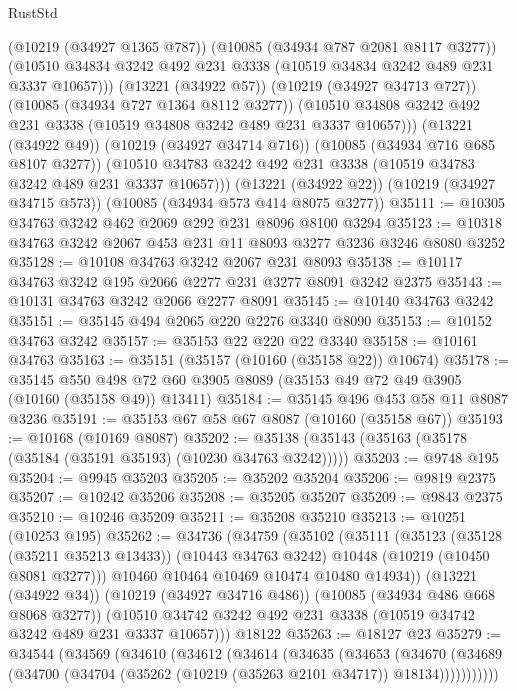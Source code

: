 \begin{lexlean}{RustStd}
\begin{coremodule}
          (@10219 (@34927 @1365 @787))
          (@10085 (@34934 @787 @2081 @8117 @3277))
          (@10510 @34834 @3242 @492 @231 @3338 (@10519 @34834 @3242 @489 @231 @3337 @10657)))
        (@13221 (@34922 @57))
        (@10219 (@34927 @34713 @727))
        (@10085 (@34934 @727 @1364 @8112 @3277))
        (@10510 @34808 @3242 @492 @231 @3338 (@10519 @34808 @3242 @489 @231 @3337 @10657)))
      (@13221 (@34922 @49))
      (@10219 (@34927 @34714 @716))
      (@10085 (@34934 @716 @685 @8107 @3277))
      (@10510 @34783 @3242 @492 @231 @3338 (@10519 @34783 @3242 @489 @231 @3337 @10657)))
    (@13221 (@34922 @22))
    (@10219 (@34927 @34715 @573))
    (@10085 (@34934 @573 @414 @8075 @3277))
@35111 := @10305 @34763 @3242 @462 @2069 @292 @231 @8096 @8100 @3294
@35123 := @10318 @34763 @3242 @2067 @453 @231 @11 @8093 @3277 @3236 @3246 @8080 @3252
@35128 := @10108 @34763 @3242 @2067 @231 @8093
@35138 := @10117 @34763 @3242 @195 @2066 @2277 @231 @3277 @8091 @3242 @2375
@35143 := @10131 @34763 @3242 @2066 @2277 @8091
@35145 := @10140 @34763 @3242
@35151 := @35145 @494 @2065 @220 @2276 @3340 @8090
@35153 := @10152 @34763 @3242
@35157 := @35153 @22 @220 @22 @3340
@35158 := @10161 @34763
@35163 := @35151 (@35157 (@10160 (@35158 @22)) @10674)
@35178 := @35145
    @550
    @498
    @72
    @60
    @3905
    @8089
    (@35153 @49 @72 @49 @3905 (@10160 (@35158 @49)) @13411)
@35184 := @35145 @496 @453 @58 @11 @8087 @3236
@35191 := @35153 @67 @58 @67 @8087 (@10160 (@35158 @67))
@35193 := @10168 (@10169 @8087)
@35202 := @35138 (@35143 (@35163 (@35178 (@35184 (@35191 @35193) (@10230 @34763 @3242)))))
@35203 := @9748 @195
@35204 := @9945 @35203
@35205 := @35202 @35204
@35206 := @9819 @2375
@35207 := @10242 @35206
@35208 := @35205 @35207
@35209 := @9843 @2375
@35210 := @10246 @35209
@35211 := @35208 @35210
@35213 := @10251 (@10253 @195)
@35262 := @34736
    (@34759
      (@35102
        (@35111
          (@35123
            (@35128 (@35211 @35213 @13433))
            (@10443 @34763 @3242)
            @10448
            (@10219 (@10450 @8081 @3277)))
          @10460
          @10464
          @10469
          @10474
          @10480
          @14934))
      (@13221 (@34922 @34))
      (@10219 (@34927 @34716 @486))
      (@10085 (@34934 @486 @668 @8068 @3277))
      (@10510 @34742 @3242 @492 @231 @3338 (@10519 @34742 @3242 @489 @231 @3337 @10657)))
    @18122
@35263 := @18127 @23
@35279 := @34544
    (@34569
      (@34610
        (@34612
          (@34614
            (@34635
              (@34653
                (@34670
                  (@34689 (@34700 (@34704 (@35262 (@10219 (@35263 @2101 @34717)) @18134)))))))))))

\end{coremodule}
\end{lexlean}
